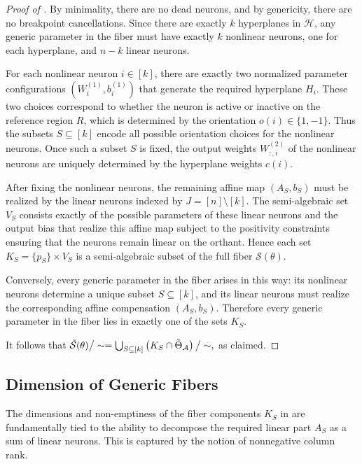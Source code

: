 \documentclass{article}
\theoremstyle{definition}
\newcommand{\architecture}{\mathcal{A}}
\newcommand{\gparamspace}[1]{\Tilde{\Theta}_{#1}}
\newcommand{\weights}[1]{W^{(#1)}}
\newcommand{\bias}[1]{b^{(#1)}}
\newcommand{\fiber}[1]{\mathcal{S}({#1})}
\newcommand{\gfiber}[1]{\Tilde{\mathcal{S}}({#1})}
\newcommand{\modulo}[1]{\big/#1}
\begin{document}
\begin{proof}[Proof of ]
By minimality, there are no dead neurons, and by genericity, there are no breakpoint cancellations. Since there are exactly $k$ hyperplanes in $\mathcal{H}$, any generic parameter in the fiber must have exactly $k$ nonlinear neurons, one for each hyperplane, and $n-k$ linear neurons.

For each nonlinear neuron $i \in [k]$, there are exactly two normalized parameter configurations $(\weights{1}_i, \bias{1}_i)$ that generate the required hyperplane $H_i$. These two choices correspond to whether the neuron is active or inactive on the reference region $R$, which is determined by the orientation $o(i) \in \{1, -1\}$. Thus the subsets $S \subseteq [k]$ encode all possible orientation choices for the nonlinear neurons. Once such a subset $S$ is fixed, the output weights $\weights{2}_{:,i}$ of the nonlinear neurons are uniquely determined by the hyperplane weights $c(i)$.

After fixing the nonlinear neurons, the remaining affine map $(A_S,b_S)$ must be realized by the linear neurons indexed by $J=[n]\setminus[k]$. The semi-algebraic set $V_S$ consists exactly of the possible parameters of these linear neurons and the output bias that realize this affine map subject to the positivity constraints ensuring that the neurons remain linear on the orthant. Hence each set
$
K_S=\{p_S\}\times V_S
$
is a semi-algebraic subset of the full fiber $\fiber{\theta}$.

Conversely, every generic parameter in the fiber arises in this way: its nonlinear neurons determine a unique subset $S\subseteq[k]$, and its linear neurons must realize the corresponding affine compensation $(A_S,b_S)$. Therefore every generic parameter in the fiber lies in exactly one of the sets $K_S$.

It follows that
$
\gfiber{\theta}\modulo{\sim}
=
\bigcup_{S\subseteq[k]} \left(K_S\cap \gparamspace{\architecture}\right) \modulo{\sim},
$
as claimed.
\end{proof}



\subsection{Dimension of Generic Fibers} 
\label{subsec:dim_generic_fibres}

The dimensions and non-emptiness of the fiber components $K_S$ in  are fundamentally tied to the ability to decompose the required linear part $A_S$ as a sum of linear neurons. 
This is captured by the notion of nonnegative column rank. 
\end{document}
